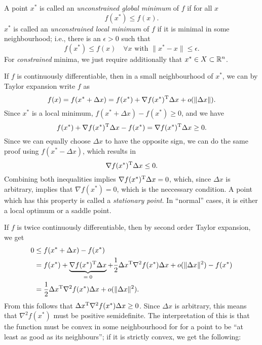 \documentclass{article}
\begin{document}
A point \(x^*\) is called an \emph{unconstrained global minimum} of \(f\) if for all \(x\)
\begin{equation*}
  f(x^*) \leq f(x).
\end{equation*}
\(x^*\) is called an \emph{unconstrained local minimum} of \(f\) if it is minimal in some
neighbourhood; i.e., there is an \(\epsilon > 0\) such that
\begin{equation*}
  f(x^*) \leq f(x) \quad \forall x \text{ with } \lVert x^* - x \rVert \leq \epsilon.
\end{equation*}
For \emph{constrained} minima, we just require additionally that \(x^* \in X \subset \mathbb{R}^n\).


\label{s:first-order-optimality}

If \(f\) is continuously differentiable, then in a small neighbourhood of \(x^*\), we can by Taylor
expansion write \(f\) as
\begin{equation*}
  f(x) = f(x^* + \Delta x) = f(x^*) + \nabla f(x^*)^{\mathrm{T}} \Delta x + o(\lVert \Delta x \rVert).
\end{equation*}
Since \(x^*\) is a local minimum, \(f(x^* + \Delta x) - f(x^*) \geq 0\), and we have
\begin{equation*}
  f(x^*) + \nabla f(x^*)^{\mathrm{T}} \Delta x - f(x^*) = \nabla f(x^*)^{\mathrm{T}} \Delta x \geq 0.
\end{equation*}
Since we can equally choose \(\Delta x\) to have the opposite sign, we can do the same proof using
  \(f(x^* - \Delta x)\), which results in
  \begin{equation*}
    \nabla f(x^*)^{\mathrm{T}} \Delta x \leq 0.
  \end{equation*}
  Combining both inequalities implies \(\nabla f(x^*)^{\mathrm{T}} \Delta x = 0\), which, since \(\Delta x\)
  is arbitrary, implies that \(\nabla f(x^*) = 0\), which is the neccessary condition.  A point which
  has this property is called a \emph{stationary point}.  In ``normal'' cases, it is either a local
  optimum or a saddle point.


\label{s:second-order-optimality}

If \(f\) is twice continuously differentiable, then by second order Taylor expansion, we get
\begin{align*}
  0 &\leq f(x^* + \Delta x) - f(x^*) \\
    &= f(x^*) + \underbrace{\nabla f(x^*)^{\mathrm{T}} \Delta x}_{=\; 0} +
      \frac{1}{2} \Delta x^{\mathrm{T}} \nabla^2 f(x^*) \Delta x + o(\lVert \Delta x \rVert^2) - f(x^*) \\
    &=  \frac{1}{2} \Delta x^{\mathrm{T}} \nabla^2 f(x^*) \Delta x + o(\lVert \Delta x \rVert^2).
\end{align*}
From this follows that \(\Delta x^{\mathrm{T}} \nabla^2 f(x^*) \Delta x \geq 0\).  Since \(\Delta x\) is
arbitrary, this means that \(\nabla^2 f(x^*)\) must be positive semidefinite.  The interpretation of
this is that the function must be convex in some neighbourhood for for a point to be ``at least as
good as its neighbours''; if it is strictly convex, we get the following:
\end{document}
